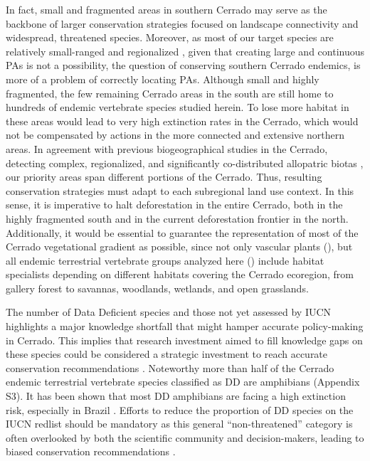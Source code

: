 \documentclass[12pt,openright,oneside,a4paper,english]{abntex2}
\begin{document}
In fact, small and fragmented areas in southern Cerrado may serve as the backbone of larger conservation strategies focused on landscape connectivity and widespread, threatened species. Moreover, as most of our target species are relatively small-ranged and regionalized \citep{Nogueira2011, Azevedo2016}, given that creating large and continuous PAs is not a possibility, the question of conserving southern Cerrado endemics, is more of a problem of correctly locating PAs. Although small and highly fragmented, the few remaining Cerrado areas in the south are still home to hundreds of endemic vertebrate species studied herein. To lose more habitat in these areas would lead to very high extinction rates in the Cerrado, which would not be compensated by actions in the more connected and extensive northern areas. In agreement with previous biogeographical studies in the Cerrado, detecting complex, regionalized, and significantly co-distributed allopatric biotas \citep{Nogueira2011, Azevedo2016}, our priority areas span different portions of the Cerrado. Thus, resulting conservation strategies must adapt to each subregional land use context. In this sense, it is imperative to halt deforestation in the entire Cerrado, both in the highly fragmented south and in the current deforestation frontier in the north. Additionally, it would be essential to guarantee the representation of most of the Cerrado vegetational gradient as possible, since not only vascular plants (\citealp[see][]{Durigan2003}), but all endemic terrestrial vertebrate groups analyzed here (\citealp[e.g.][]{Nogueira2011, Valdujo2012, Carmignotto2022}) include habitat specialists depending on different habitats covering the Cerrado ecoregion, from gallery forest to savannas, woodlands, wetlands, and open grasslands.

The number of Data Deficient species and those not yet assessed by IUCN highlights a major knowledge shortfall that might hamper accurate policy-making in Cerrado. This implies that research investment aimed to fill knowledge gaps on these species could be considered a strategic investment to reach accurate conservation recommendations \citep{Nori2018, Nori2020}. Noteworthy more than half of the Cerrado endemic terrestrial vertebrate species classified as DD are amphibians (Appendix S3). It has been shown that most DD amphibians are facing a high extinction risk, especially in Brazil \citep{Morais2013}. Efforts to reduce the proportion of DD species on the IUCN redlist should be mandatory as this general “non-threatened” category is often overlooked by both the scientific community and decision-makers, leading to biased conservation recommendations \citep{Nori2018}.
\end{document}
